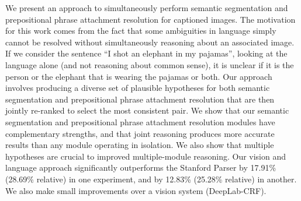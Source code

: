 We present an approach to simultaneously perform semantic segmentation and prepositional phrase attachment resolution for captioned images.  The motivation for this work comes from the fact that some ambiguities in language simply cannot be resolved without simultaneously reasoning about an associated image. If we consider the sentence ``I shot an elephant in my pajamas'', looking at the language alone (and not reasoning about common sense), it is unclear if it is the person or the elephant that is wearing the pajamas or both. Our approach involves producing a diverse set of plausible hypotheses for both semantic segmentation and prepositional phrase attachment resolution that are then jointly re-ranked to select the most consistent pair. We show that our semantic segmentation and prepositional phrase attachment resolution modules have complementary strengths, and that joint reasoning produces more accurate results than any module operating in isolation. We also show that multiple hypotheses are crucial to improved multiple-module reasoning. Our vision and language approach significantly outperforms the Stanford Parser by 17.91\% (28.69\% relative) in one experiment, and by 12.83\% (25.28\% relative) in another. We also make small improvements over a vision system (DeepLab-CRF).
